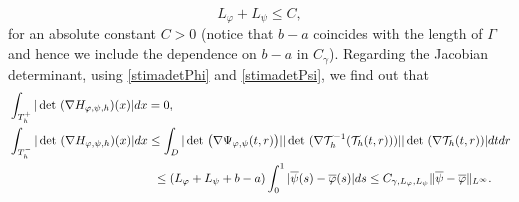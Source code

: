 \documentclass[a4paper,11pt]{article}
\numberwithin{equation}{section}
\newtheorem{prop}[theorem]{Proposition}
\def\det{\,{\rm det\ }}
\newcommand{\R}{\mathbb{R}}
\newcommand{\res}      {\mathop{\hbox{\vrule height 7pt width .5pt depth
                        0pt\vrule height .5pt width 6pt depth 0pt}}\nolimits}
\begin{document}
$$L_\varphi+L_\psi\leq C,$$
for an absolute constant $C>0$ (notice that $b-a$ coincides with the length of $\Gamma$ and hence we include the dependence on $b-a$ in $C_\gamma$).
Regarding the Jacobian determinant, using \eqref{stimadetPhi} and \eqref{stimadetPsi}, 
we find out that  
\begin{align}\label{est:detH}
&\int_{T_h^+}|\det(\nabla H_{\varphi,\psi,h})(x)|dx=0,\\
&\int_{T_h^-}|\det(\nabla H_{\varphi,\psi,h})(x)|dx\leq \int_D|\det\big(\nabla \Psi_{\varphi,\psi}(t,r)\big)||\det(\nabla \mathcal T_h^{-1}(\mathcal T_h(t,r)))||\det(\nabla \mathcal T_h(t,r))|dtdr\nonumber\\
&\qquad \qquad \qquad \qquad \qquad \qquad\leq (L_\varphi+L_\psi+b-a)\int_0^{1}|{\overline \psi}(s)-{\overline \varphi}(s)|ds\leq C_{\gamma,L_\varphi,L_\psi}\|{\overline \psi}-{\overline \varphi}\|_{L^\infty}.\nonumber
\end{align}
%
%
%
%
%
\end{document}
